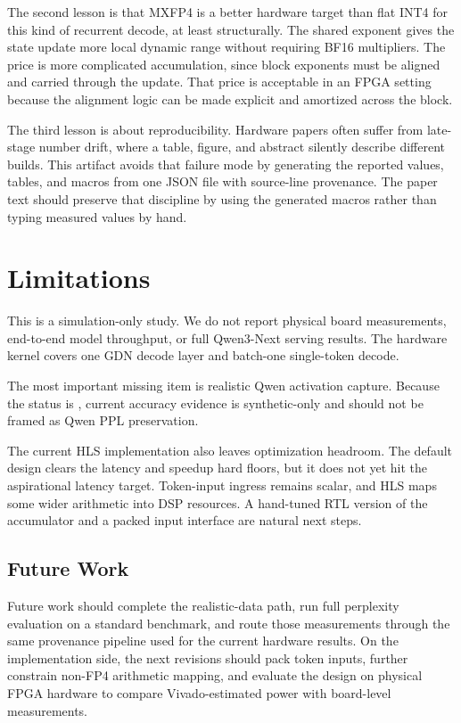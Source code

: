 \documentclass[conference]{IEEEtran}
\begin{document}
The second lesson is that MXFP4 is a better hardware target than flat INT4 for
this kind of recurrent decode, at least structurally. The shared exponent gives
the state update more local dynamic range without requiring BF16 multipliers.
The price is more complicated accumulation, since block exponents must be
aligned and carried through the update. That price is acceptable in an FPGA
setting because the alignment logic can be made explicit and amortized across
the block.

The third lesson is about reproducibility. Hardware papers often suffer from
late-stage number drift, where a table, figure, and abstract silently describe
different builds. This artifact avoids that failure mode by generating the
reported values, tables, and macros from one JSON file with source-line
provenance. The paper text should preserve that discipline by using the generated
macros rather than typing measured values by hand.

\section{Limitations}

This is a simulation-only study. We do not report physical board measurements,
end-to-end model throughput, or full Qwen3-Next serving results. The hardware
kernel covers one GDN decode layer and batch-one single-token decode.

The most important missing item is realistic Qwen activation capture. Because
the status is \QwenCaptureStatus, current accuracy evidence is synthetic-only and
should not be framed as Qwen PPL preservation.

The current HLS implementation also leaves optimization headroom. The default
design clears the latency and speedup hard floors, but it does not yet hit the
aspirational latency target. Token-input ingress remains scalar, and HLS maps
some wider arithmetic into DSP resources. A hand-tuned RTL version of the
accumulator and a packed input interface are natural next steps.

\subsection{Future Work}

Future work should complete the realistic-data path, run full perplexity
evaluation on a standard benchmark, and route those measurements through the
same provenance pipeline used for the current hardware results. On the
implementation side, the next revisions should pack token inputs, further
constrain non-FP4 arithmetic mapping, and evaluate the design on physical FPGA
hardware to compare Vivado-estimated power with board-level measurements.
\end{document}
